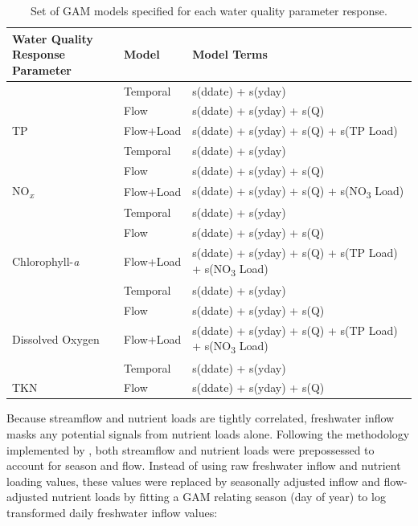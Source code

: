 \documentclass[water,article,submit,oneauthor]{Definitions/mdpi}
\begin{document}
\begin{table}[H]

\caption{\label{tab:estgammodels}Set of GAM models specified for each water quality parameter response.}
\centering
\begin{tabular}[t]{lll}
\toprule
\makecell[l]{Water Quality\\Response Parameter} & Model & Model Terms\\
\midrule
 & Temporal & s(ddate) + s(yday)\\

 & Flow & s(ddate) + s(yday) + s(Q)\\

\multirow{-3}{*}{\raggedright\arraybackslash TP} & Flow+Load & s(ddate) + s(yday) + s(Q) + s(TP Load)\\
\cmidrule{1-3}
 & Temporal & s(ddate) + s(yday)\\

 & Flow & s(ddate) + s(yday) + s(Q)\\

\multirow{-3}{*}{\raggedright\arraybackslash NO\textsubscript{\emph{x}}} & Flow+Load & s(ddate) + s(yday) + s(Q) + s(NO\textsubscript{3} Load)\\
\cmidrule{1-3}
 & Temporal & s(ddate) + s(yday)\\

 & Flow & s(ddate) + s(yday) + s(Q)\\

\multirow{-3}{*}{\raggedright\arraybackslash Chlorophyll-\emph{a}} & Flow+Load & s(ddate) + s(yday) + s(Q) + s(TP Load) + s(NO\textsubscript{3} Load)\\
\cmidrule{1-3}
 & Temporal & s(ddate) + s(yday)\\

 & Flow & s(ddate) + s(yday) + s(Q)\\

\multirow{-3}{*}{\raggedright\arraybackslash Dissolved Oxygen} & Flow+Load & s(ddate) + s(yday) + s(Q) + s(TP Load) + s(NO\textsubscript{3}  Load)\\
\cmidrule{1-3}
 & Temporal & s(ddate) + s(yday)\\

\multirow{-2}{*}{\raggedright\arraybackslash TKN} & Flow & s(ddate) + s(yday) + s(Q)\\
\bottomrule
\end{tabular}
\end{table}

Because streamflow and nutrient loads are tightly correlated, freshwater
inflow masks any potential signals from nutrient loads alone. Following
the methodology implemented by
\citet{murphyNutrientImprovementsChesapeake2022}, both streamflow and
nutrient loads were prepossessed to account for season and flow. Instead
of using raw freshwater inflow and nutrient loading values, these values
were replaced by seasonally adjusted inflow and flow-adjusted nutrient
loads by fitting a GAM relating season (day of year) to log transformed
daily freshwater inflow values:
\end{document}
